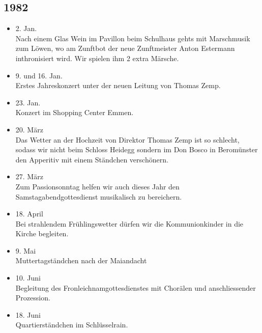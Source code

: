 \subsection*{1982}

\begin{history}


    \begin{itemize}

        \item 2. Jan.\\
              Nach einem Glas Wein im Pavillon beim Schulhaus gehts mit Marschmusik
              zum Löwen, wo am Zunftbot der neue Zunftmeister Anton Estermann
              inthronisiert wird. Wir spielen ihm 2 extra Märsche.

        \item 9. und 16. Jan.\\
              Erstes Jahreskonzert unter der neuen Leitung von Thomas Zemp.

        \item 23. Jan.\\
              Konzert im Shopping Center Emmen.

        \item 20. März\\
              Das Wetter an der Hochzeit von Direktor Thomas Zemp ist so schlecht,
              sodass wir nicht beim Schloss Heidegg sondern im Don Bosco in
              Beromünster den Apperitiv mit einem Ständchen verschönern.

        \item 27. März\\
              Zum Passionsonntag helfen wir auch dieses Jahr den
              Samstagabendgottesdienst musikalisch zu bereichern.

        \item 18. April\\
              Bei strahlendem Frühlingswetter dürfen wir die Kommunionkinder in die
              Kirche begleiten.

        \item 9. Mai\\
              Muttertagständchen nach der Maiandacht

        \item 10. Juni\\
              Begleitung des Fronleichnamgottesdienstes mit Chorälen und
              anschliessender Prozession.

        \item 18. Juni\\
              Quartierständchen im Schlüsselrain.


\end{itemize}
\end{history}
